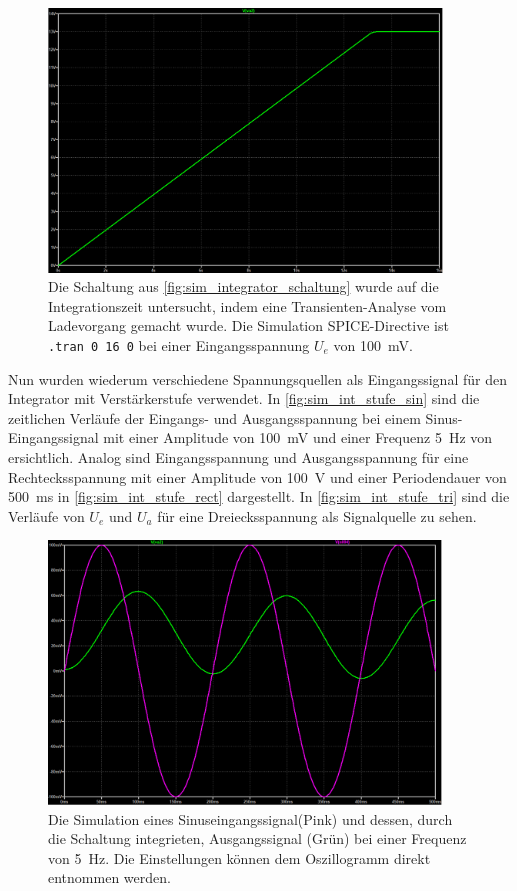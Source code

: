 \documentclass[12pt,english,ngerman]{scrartcl}
\begin{document}
\begin{figure}[H]
  \centering
    \includegraphics[width=\linewidth, height=7cm]{./figures/integrator/sim/mit_stufe/100mv_aus_zeit.png}
  \caption{Die Schaltung aus \autoref{fig:sim_integrator_schaltung} wurde auf
  die Integrationszeit untersucht, indem eine Transienten-Analyse vom
  Ladevorgang gemacht wurde. Die Simulation SPICE-Directive ist \texttt{.tran 0 16 0} 
  bei einer Eingangsspannung $U_e$ von \SI{100}{\milli\volt}.}
  \label{fig:sim_integrator_stufe_integrationszeit}
\end{figure}

Nun wurden wiederum verschiedene Spannungsquellen als Eingangssignal für den
Integrator mit Verstärkerstufe verwendet. In \autoref{fig:sim_int_stufe_sin}
sind die zeitlichen Verläufe der Eingangs- und Ausgangsspannung bei einem
Sinus-Eingangssignal mit einer Amplitude von \SI{100}{\milli\volt} und einer
Frequenz \SI{5}{\hertz} von ersichtlich. Analog sind Eingangsspannung und
Ausgangsspannung für eine Rechtecksspannung mit einer Amplitude von
\SI{100}{\volt} und einer Periodendauer von \SI{500}{\milli\second} in
\autoref{fig:sim_int_stufe_rect} dargestellt. In
\autoref{fig:sim_int_stufe_tri} sind die Verläufe von $U_e$ und $U_a$ für eine
Dreiecksspannung als Signalquelle zu sehen.

\begin{figure}[H]
  \centering
    \includegraphics[width=\linewidth, height=7cm]{./figures/integrator/sim/mit_stufe/sin100mv_5hz.png}
  \caption{Die Simulation eines Sinuseingangssignal(Pink) und dessen, durch die Schaltung integrieten,
  Ausgangssignal (Grün) bei einer Frequenz von \SI{5}{\hertz}. Die
  Einstellungen können dem Oszillogramm direkt entnommen werden.}
  \label{fig:sim_int_stufe_sin}
\end{figure}
\end{document}
